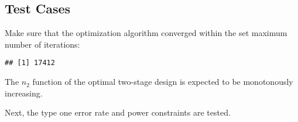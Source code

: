 \documentclass[
]{book}
\newenvironment{Shaded}{\begin{snugshade}}{\end{snugshade}}
\newcommand{\DecValTok}[1]{\textcolor[rgb]{0.00,0.00,0.81}{#1}}
\newcommand{\KeywordTok}[1]{\textcolor[rgb]{0.13,0.29,0.53}{\textbf{#1}}}
\newcommand{\NormalTok}[1]{#1}
\newcommand{\OperatorTok}[1]{\textcolor[rgb]{0.81,0.36,0.00}{\textbf{#1}}}
\newcommand{\StringTok}[1]{\textcolor[rgb]{0.31,0.60,0.02}{#1}}
\begin{document}
\hypertarget{test-cases-1}{%
\subsection{Test Cases}\label{test-cases-1}}

Make sure that the optimization algorithm converged within the set
maximum number of iterations:

\begin{Shaded}
\end{Shaded}

\begin{verbatim}
## [1] 17412
\end{verbatim}

The \(n_2\) function of the optimal two-stage design is expected to be
monotonously increasing.

\begin{Shaded}
\end{Shaded}

Next, the type one error rate and power constraints are tested.
\end{document}
